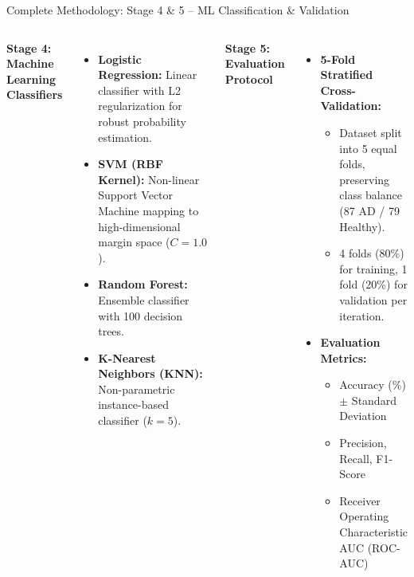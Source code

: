 \documentclass[aspectratio=169]{beamer}
\begin{document}
\begin{frame}{Complete Methodology: Stage 4 \& 5 -- ML Classification \& Validation}
    \begin{columns}[T]
        \textbf{Stage 4: Machine Learning Classifiers}
        \begin{itemize}
            \item \textbf{Logistic Regression:} Linear classifier with L2 regularization for robust probability estimation.
            \item \textbf{SVM (RBF Kernel):} Non-linear Support Vector Machine mapping to high-dimensional margin space ($C=1.0$).
            \item \textbf{Random Forest:} Ensemble classifier with 100 decision trees.
            \item \textbf{K-Nearest Neighbors (KNN):} Non-parametric instance-based classifier ($k=5$).
        \end{itemize}

        \textbf{Stage 5: Evaluation Protocol}
        \begin{itemize}
            \item \textbf{5-Fold Stratified Cross-Validation:}
                \begin{itemize}
                    \item Dataset split into 5 equal folds, preserving class balance (87 AD / 79 Healthy).
                    \item 4 folds (80\%) for training, 1 fold (20\%) for validation per iteration.
                \end{itemize}
            \item \textbf{Evaluation Metrics:}
                \begin{itemize}
                    \item Accuracy (\%) $\pm$ Standard Deviation
                    \item Precision, Recall, F1-Score
                    \item Receiver Operating Characteristic AUC (ROC-AUC)
                \end{itemize}
        \end{itemize}
    \end{columns}
\end{frame}

\end{document}

